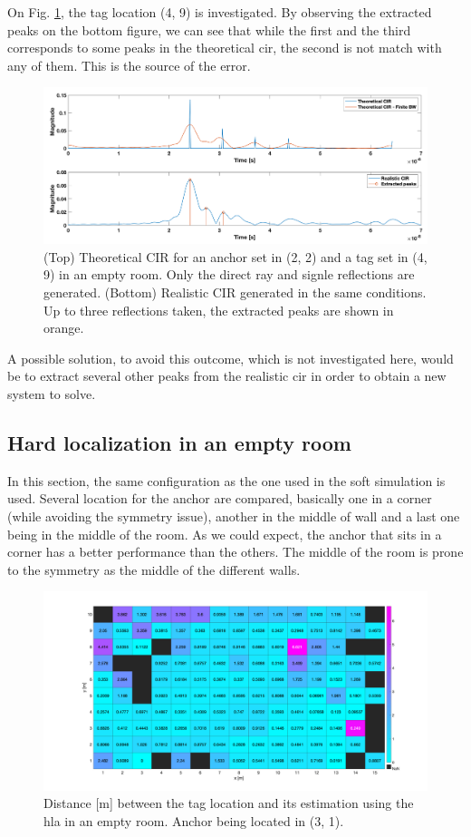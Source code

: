 On Fig. \ref{fig:cir_4_9}, the tag location (4, 9) is investigated. By observing the extracted peaks on the bottom figure, we can see that while the first and the third corresponds to some peaks in the theoretical \gls{cir}, the second is not match with any of them. This is the source of the error. 

\begin{figure}[H]
\centering
\includegraphics[width=.9\linewidth]{Images/hla_images/cir_4_9.png}
\caption{(Top) Theoretical CIR for an anchor set in (2, 2) and a tag set in (4, 9) in an empty room. Only the direct ray and signle reflections are generated. (Bottom) Realistic CIR generated in the same conditions. Up to three reflections taken, the extracted peaks are shown in orange.\label{fig:cir_4_9}}
\end{figure}

A possible solution, to avoid this outcome, which is not investigated here, would be to extract several other peaks from the realistic \gls{cir} in order to obtain a new system to solve. 

\subsection{Hard localization in an empty room}

In this section, the same configuration as the one used in the soft simulation is used. Several location for the anchor are compared, basically one in a corner (while avoiding the symmetry issue), another in the middle of wall and a last one being in the middle of the room. As we could expect, the anchor that sits in a corner has a better performance than the others. The middle of the room is prone to the symmetry as the middle of the different walls.

\begin{figure}[H]
\centering
\includegraphics[width=.9\linewidth]{Images/hla_images/hla_anchor_(3_1).png}
\caption{Distance [m] between the tag location and its estimation using the \gls{hla} in an empty room. Anchor being located in (3, 1). \label{fig:hla_empty_1}}
\end{figure}

